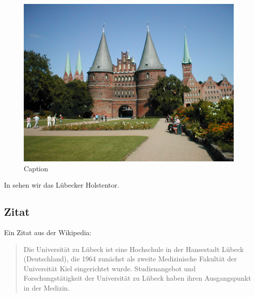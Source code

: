 \begin{figure}[H]
    \centering
    \includegraphics[scale=.3]{images/LuebeckHolstentor}
    \caption{Caption}
    \label{fig:LuebeckHolstentor}
\end{figure}

In  sehen wir das Lübecker Holstentor.


\subsection{Zitat}

Ein Zitat aus der Wikipedia:

\begin{quote}
	\begin{myquote}
		Die Universität zu Lübeck ist eine Hochschule in der Hansestadt Lübeck (Deutschland), die 1964 zunächst als zweite Medizinische Fakultät der Universität Kiel eingerichtet wurde. Studienangebot und Forschungstätigkeit der Universität zu Lübeck haben ihren Ausgangspunkt in der Medizin.
		\label{quote:uni}
	\end{myquote}
\end{quote}


%
%


